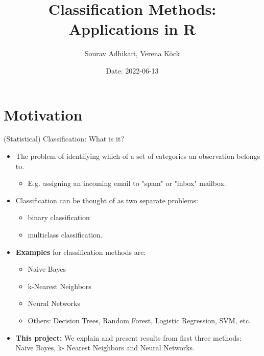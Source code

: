\documentclass[aspectratio=1610, t]{beamer}\usepackage[]{graphicx}\usepackage[]{color}
\author{Sourav Adhikari, {Verena K\"ock}}             %
\title{\LARGE {Classification Methods: \\ Applications in R} }  %
\date{Date: 2022-06-13}                    %
\subtitle{ }                          %
\begin{document}
\maketitle

													
													

\section{Motivation}


\begin{frame}{(Statistical) Classification: What is it?}

\begin{itemize}
\item The problem of identifying which of a set of categories an observation belongs to.
  \begin{itemize}
  \item E.g. assigning an incoming email to "spam" or "inbox" mailbox.
  \end{itemize}
\item Classification can be thought of as two separate problems: 
  \begin{itemize}
  \item binary classification 
  \item multiclass classification.
  \end{itemize}
\medskip
\item \textcolor{wublue}{\textbf{Examples}} for classification methods are:
  \begin{itemize}
  \item Naive Bayes
  \item k-Nearest Neighbors
  \item Neural Networks
  \item Others: Decision Trees, Random Forest, Logistic Regression, SVM, etc.
  \end{itemize}
  \medskip
\item  \textcolor{wublue}{\textbf{This project:}} We explain and present results from first three methods: Naive Bayes, k- Nearest Neighbors and Neural Networks.
\end{itemize}

\end{frame}
\end{document}
